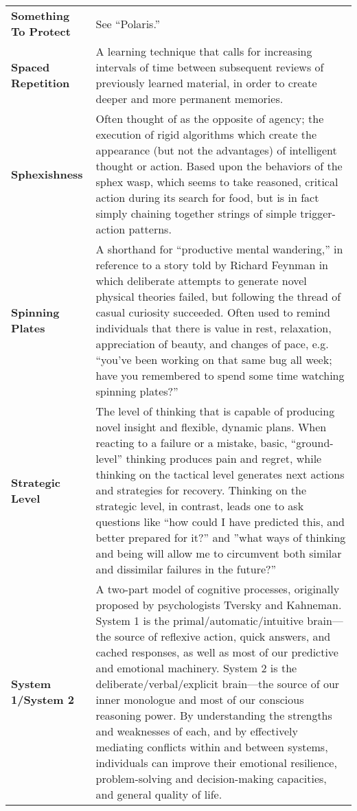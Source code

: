 \begin{longtable} { p{} p{} }
\textbf{Something To Protect} & See ``Polaris.''\\

\textbf{Spaced Repetition} & A learning technique that calls for increasing intervals of time between subsequent reviews of previously learned material, in order to create deeper and more permanent memories.\\

\textbf{Sphexishness} & Often thought of as the opposite of agency; the execution of rigid algorithms which create the appearance (but not the advantages) of intelligent thought or action.  Based upon the behaviors of the sphex wasp, which seems to take reasoned, critical action during its search for food, but is in fact simply chaining together strings of simple trigger-action patterns.\\

\textbf{Spinning Plates} & A shorthand for ``productive mental wandering,'' in reference to a story told by Richard Feynman in which deliberate attempts to generate novel physical theories failed, but following the thread of casual curiosity succeeded.  Often used to remind individuals that there is value in rest, relaxation, appreciation of beauty, and changes of pace, e.g. ``you've been working on that same bug all week; have you remembered to spend some time watching spinning plates?''\\

\textbf{Strategic Level} & The level of thinking that is capable of producing novel insight and flexible, dynamic plans.  When reacting to a failure or a mistake, basic, ``ground-level'' thinking produces pain and regret, while thinking on the tactical level generates next actions and strategies for recovery.  Thinking on the strategic level, in contrast, leads one to ask questions like ``how could I have predicted this, and better prepared for it?'' and ''what ways of thinking and being will allow me to circumvent both similar and dissimilar failures in the future?''\\

\textbf{System 1/System 2} & A two-part model of cognitive processes, originally proposed by psychologists Tversky and Kahneman.  System 1 is the primal/automatic/intuitive brain---the source of reflexive action, quick answers, and cached responses, as well as most of our predictive and emotional machinery.  System 2 is the deliberate/verbal/explicit brain---the source of our inner monologue and most of our conscious reasoning power.  By understanding the strengths and weaknesses of each, and by effectively mediating conflicts within and between systems, individuals can improve their emotional resilience, problem-solving and decision-making capacities, and general quality of life.\\


\end{longtable}
